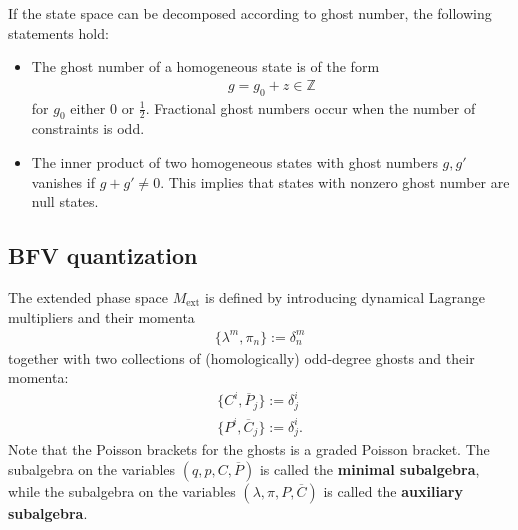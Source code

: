    \begin{property}
        If the state space can be decomposed according to ghost number, the following statements hold:
        \begin{itemize}
            \item The ghost number of a homogeneous state is of the form
                \begin{gather}
                    g = g_0 + z\in\mathbb{Z}
                \end{gather}
                for $g_0$ either $0$ or $\frac{1}{2}$. Fractional ghost numbers occur when the number of constraints is odd.
            \item The inner product of two homogeneous states with ghost numbers $g,g'$ vanishes if $g+g'\neq0$. This implies that states with nonzero ghost number are null states.
        \end{itemize}
    \end{property}


\subsection{BFV quantization}

    The extended phase space $M_\mathrm{ext}$ is defined by introducing dynamical Lagrange multipliers and their momenta
    \begin{gather}
        \{\lambda^m,\pi_n\} := \delta^m_n
    \end{gather}
    together with two collections of (homologically) odd-degree ghosts and their momenta:
    \begin{gather}
        \{C^i,\overline{P}_j\} := \delta^i_j\\
        \{P^i,\overline{C}_j\} := \delta^i_j.
    \end{gather}
    Note that the Poisson brackets for the ghosts is a graded Poisson bracket. The subalgebra on the variables $(q,p,C,\overline{P})$ is called the \textbf{minimal subalgebra}, while the subalgebra on the variables $(\lambda,\pi,P,\overline{C})$ is called the \textbf{auxiliary subalgebra}.

